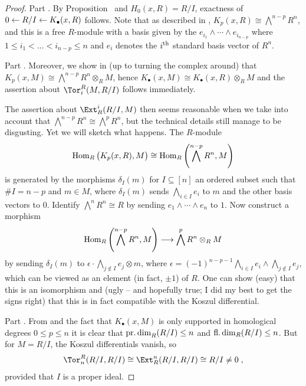 \documentclass[a4paper,parskip=half,numbers=enddot, DIV=12]{scrreprt}
\begin{document}
\begin{proof}
	Part . By Proposition~ and $H_0(x,R)=R/I$, exactness of $0\lmorphism R/I\lmorphism K_\bullet(x,R)$ follows. Note that as described in \cite[Remark~2.1.2]{alggeo2}, $K_p(x,R)\cong \bigwedge^{n-p}R^n$, and this is a free $R$-module with a basis given by the $e_{i_1}\wedge \cdots\wedge e_{i_{n-p}}$ where $1\leq i_1<\ldots<i_{n-p}\leq n$ and $e_i$ denotes the $i^{\text{th}}$ standard basis vector of $R^n$.
	
	Part . Moreover, we show in \cite[Remark~2.1.2]{alggeo2} (up to turning the complex around) that $K_p(x,M)\cong \bigwedge^{n-p}R^n\otimes_RM$, hence $K_\bullet(x,M)\cong K_\bullet(x,R)\otimes_RM$ and the assertion about $\Tor_i^R(M,R/I)$ follows immediately. 
	
	The assertion about $\Ext_R^i(R/I,M)$ then seems reasonable when we take into account that $\bigwedge^{n-p}R^n\cong \bigwedge^pR^n$, but the technical details still manage to be disgusting. Yet we will sketch what happens. The $R$-module 
	\begin{align*}
		\operatorname{Hom}_R\big(K_p(x,R),M\big)\cong \operatorname{Hom}_R\left(\bigwedge^{n-p}R^n,M\right)
	\end{align*}
	is generated by the morphisms $\delta_I(m)$ for $I\subseteq [n]$ an ordered subset such that $\#I=n-p$ and $m\in M$, where $\delta_I(m)$ sends $\bigwedge_{i\in I}e_i$ to $m$ and the other basis vectors to $0$. Identify $\bigwedge^n R^n\cong R$ by sending $e_1\wedge\cdots\wedge e_n$ to $1$. Now construct a morphism 
	\begin{align*}
		\Hom_R\left(\bigwedge^{n-p}R^n,M\right)\morphism \bigwedge^pR^n\otimes_R M
	\end{align*}
	by sending $\delta_I(m)$ to $\epsilon\cdot \bigwedge_{j\notin I}e_j\otimes m$, where $\epsilon=(-1)^{n-p-1}\bigwedge_{i\in I}e_i\wedge\bigwedge_{j\notin I}e_j$, which can be viewed as an element (in fact, $\pm 1$) of $R$. One can show (easy) that this is an isomorphism and (ugly -- and hopefully true; I did my best to get the signs right) that this is in fact compatible with the Koszul differential.
	
	Part . From  and the fact that $K_\bullet(x,M)$ is only supported in homological degrees $0\leq p\leq n$ it is clear that $\operatorname{pr.dim}_R(R/I)\leq n$ and $\operatorname{fl.dim}_R(R/I)\leq n$. But for $M=R/I$, the Koszul differentials vanish, so
	\begin{align*}
		\Tor_n^R(R/I,R/I)\cong\Ext_R^n(R/I,R/I)\cong R/I\neq 0\;, 
	\end{align*}
	provided that $I$ is a proper ideal.
\end{proof}
\end{document}
